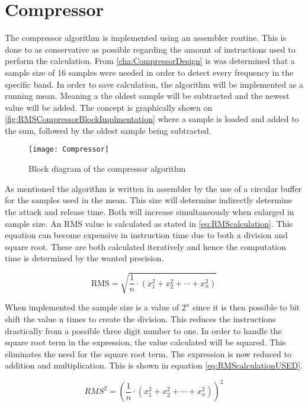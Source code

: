 \chapter{Compressor}

The compressor algorithm is implemented using an assembler routine. This is done to as conservative as possible regarding the amount of instructions used to perform the calculation. From \ref{cha:CompressorDesign} is was determined that a sample size of 16 samples were needed in order to detect every frequency in the specific band. In order to save calculation, the algorithm will be implemented as a running mean. Meaning a the oldest sample will be subtracted and the newest value will be added. The concept is graphically shown on \autoref{fig:RMSCompressorBlockImplmentation} where a sample is loaded and added to the sum, followed by the oldest sample being subtracted.


\begin{figure}[H]
    \centering
\texttt{[image: Compressor]}
    \caption{Block diagram of the compressor algorithm}
    \label{fig:RMSCompressorBlockImplmentation}
\end{figure}

As mentioned the algorithm is written in assembler by the use of a circular buffer for the samples used in the mean. This size will determine indirectly determine the attack and release time. Both will increase simultaneously when enlarged in sample size. An RMS value is calculated as stated in \autoref{eq:RMScalculation}. This equation can become expensive in instruction time due to both a division and square root. These are both calculated iteratively and hence the computation time is determined by the wanted precision.

\begin{equation}\label{eq:RMScalculation}
\text{RMS}=\sqrt{\frac{1}{n}\cdot(x_1^2+x_2^2+\cdots+x_n^2)}
\end{equation}

When implemented the sample size is a value of $2^n$ since it is then possible to bit shift the value n times to create the division. This reduces the instructions drastically from a possible three digit number to one. In order to handle the square root term in the expression, the value calculated will be squared. This eliminates the need for the square root term. The expression is now reduced to addition and multiplication. This is shown in equation \ref{eq:RMScalculationUSED}.

\begin{equation}\label{eq:RMScalculationUSED}
RMS^2=(\frac{1}{n}\cdot(x_1^2+x_2^2+\cdots+x_n^2))^2
\end{equation}


